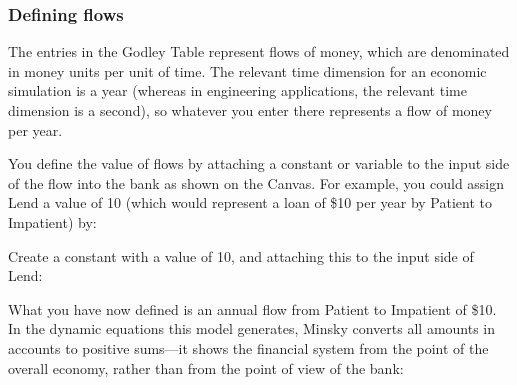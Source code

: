 \subsubsection{Defining flows}

The entries in the Godley Table represent flows of money, which are
denominated in money units per unit of time. The relevant time
dimension for an economic simulation is a year (whereas in engineering
applications, the relevant time dimension is a second), so whatever
you enter there represents a flow of money per year.


You define the value of flows by attaching a constant or variable to
the input side of the flow into the bank as shown on the Canvas. For
example, you could assign Lend a value of 10 (which would represent a
loan of \$10 per year by Patient to Impatient) by:



Create a constant with a value of 10, and attaching this to the input
side of Lend:

\begin{center}
\end{center}

What you have now defined is an annual flow from Patient to Impatient
of \$10. In the dynamic equations this model generates, Minsky
converts all amounts in accounts to positive sums---it shows the
financial system from the point of the overall economy, rather than
from the point of view of the bank:

